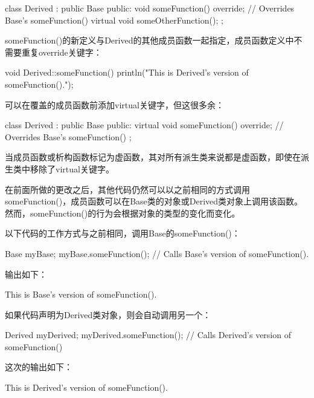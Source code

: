 \begin{cpp}
class Derived : public Base
{
    public:
        void someFunction() override; // Overrides Base's someFunction()
        virtual void someOtherFunction();
};
\end{cpp}

someFunction()的新定义与Derived的其他成员函数一起指定，成员函数定义中不需要重复override关键字：

\begin{cpp}
void Derived::someFunction()
{
    println("This is Derived's version of someFunction().");
}
\end{cpp}

可以在覆盖的成员函数前添加virtual关键字，但这很多余：

\begin{cpp}
class Derived : public Base
{
    public:
        virtual void someFunction() override; // Overrides Base's someFunction()
};
\end{cpp}

当成员函数或析构函数标记为虚函数，其对所有派生类来说都是虚函数，即使在派生类中移除了virtual关键字。


在前面所做的更改之后，其他代码仍然可以以之前相同的方式调用someFunction()，成员函数可以在Base类的对象或Derived类对象上调用该函数。然而，someFunction()的行为会根据对象的类型的变化而变化。

以下代码的工作方式与之前相同，调用Base的someFunction()：

\begin{cpp}
Base myBase;
myBase.someFunction(); // Calls Base's version of someFunction().
\end{cpp}

输出如下：

\begin{shell}
This is Base's version of someFunction().
\end{shell}

如果代码声明为Derived类对象，则会自动调用另一个：

\begin{cpp}
Derived myDerived;
myDerived.someFunction(); // Calls Derived's version of someFunction()
\end{cpp}

这次的输出如下：

\begin{shell}
This is Derived's version of someFunction().
\end{shell}

